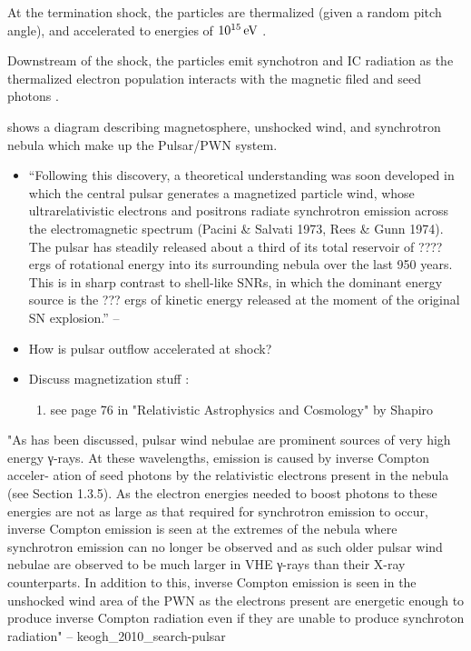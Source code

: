 At the termination shock, the particles are
thermalized (given a random pitch angle), and accelerated
to energies of $10^{15}\,\text{eV}$
\citep{arons_1996_pulsars-gamma-rays}.

Downstream of the shock, the particles emit synchotron and \ac{IC}
radiation as the thermalized electron population interacts with the
magnetic filed and seed photons \citep{gaensler_2006_evolution-structure}.

 shows a
diagram describing magnetosphere, unshocked wind, and synchrotron
nebula which make up the Pulsar/\ac{PWN} system.



\begin{itemize}
  \item ``Following this discovery, a theoretical understanding was
  soon developed in which the central pulsar generates a magnetized
  particle wind, whose ultrarelativistic electrons and positrons radiate
  synchrotron emission across the electromagnetic spectrum (Pacini \&
  Salvati 1973, Rees \& Gunn 1974). The pulsar has steadily released
  about a third of its total reservoir of ???? ergs
  of rotational energy into its surrounding nebula over the last 950
  years. This is in sharp contrast to shell-like SNRs, in which the
  dominant energy source is the ??? ergs of kinetic energy
  released at the moment of the original SN explosion.''  -- \cite{gaensler_2006_evolution-structure}
  \item How is pulsar outflow accelerated at shock?
  \item Discuss magnetization stuff :
    \begin{enumerate}
      \item see page 76 in "Relativistic Astrophysics and Cosmology" by Shapiro
    \end{enumerate}
\end{itemize}




"As has been discussed, pulsar wind nebulae are prominent sources of
very high energy γ-rays. At these wavelengths, emission is caused
by inverse Compton acceler- ation of seed photons by the relativistic
electrons present in the nebula (see Section 1.3.5). As the electron
energies needed to boost photons to these energies are not as large as
that required for synchrotron emission to occur, inverse Compton emission
is seen at the extremes of the nebula where synchrotron emission can no
longer be observed and as such older pulsar wind nebulae are observed to
be much larger in VHE γ-rays than their X-ray counterparts. In addition
to this, inverse Compton emission is seen in the unshocked wind area of
the PWN as the electrons present are energetic enough to produce inverse
Compton radiation even if they are unable to produce synchroton radiation"
-- keogh\_2010\_search-pulsar


